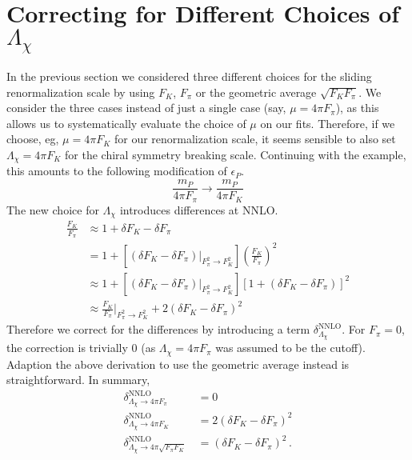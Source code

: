 \documentclass[prd,tightenlines,preprintnumbers,showpacs,superscriptaddress,notitlepage,eqsecnum,floatfix,notitlepage]{revtex4-1}
\begin{document}
\section{\boldmath Correcting for Different Choices of $\Lambda_\chi$}
In the previous section we considered three different choices for the sliding renormalization scale by using $F_K$, $F_\pi$ or the geometric average $\sqrt{F_K F_\pi}$. We consider the three cases instead of just a single case (say, $\mu = 4 \pi F_\pi$), as this allows us to systematically evaluate the choice of $\mu$ on our fits. Therefore, if we choose, eg,  $\mu=4\pi F_K$ for our renormalization scale, it seems sensible to also set $\Lambda_\chi = 4 \pi F_K$ for the chiral symmetry breaking scale. Continuing with the example, this amounts to the following modification of $\epsilon_P$.
\begin{equation}
\frac{m_P}{4 \pi F_\pi} \rightarrow \frac{m_P}{4 \pi F_K}
\end{equation}
The new choice for $\Lambda_\chi$ introduces differences at NNLO. 
\begin{align}
\frac{F_K}{F_\pi} &\approx 1 + \delta F_K - \delta F_\pi \nonumber \\
&= 1 +\left[ \left(\delta F_K - \delta F_\pi \right) \big\rvert_{F^2_\pi \rightarrow F_K^2} \right]
\left(   \frac{F_K}{F_\pi} \right)^2  \nonumber \\
&\approx 1 +\left[ \left(\delta F_K - \delta F_\pi \right) \big\rvert_{F^2_\pi \rightarrow F_K^2} \right]
 \left[  1 + \left(\delta F_K - \delta F_\pi \right)  \right]^2 \nonumber \\
 &\approx \frac{F_K}{F_\pi} \Big\rvert_{F^2_\pi \rightarrow F_K^2} 
 + 2 \left(\delta F_K - \delta F_\pi \right)^2
\end{align}
Therefore we correct for the differences by introducing a term $\delta^\text{NNLO}_{\Lambda_\chi}$. For $F_\pi = 0$, the correction is trivially 0 (as $\Lambda_\chi=4\pi F_\pi$ was assumed to be the cutoff). Adaption the above derivation to use the geometric average instead is straightforward. In summary, 
\begin{align}
\delta^\text{NNLO}_{\Lambda_\chi \rightarrow 4 \pi F_\pi} \, \, \, \, \, \, \, \, \, \, \,&= 0 \nonumber \\
\delta^\text{NNLO}_{\Lambda_\chi \rightarrow 4 \pi F_K}    \, \, \, \, \, \,  \, \, \, \, &= 2 \left(\delta F_K - \delta F_\pi \right)^2 \nonumber \\
\delta^\text{NNLO}_{\Lambda_\chi \rightarrow 4 \pi \sqrt{F_\pi F_K}} &=  \left(\delta F_K - \delta F_\pi \right) ^2 \, .
\end{align}
\end{document}
